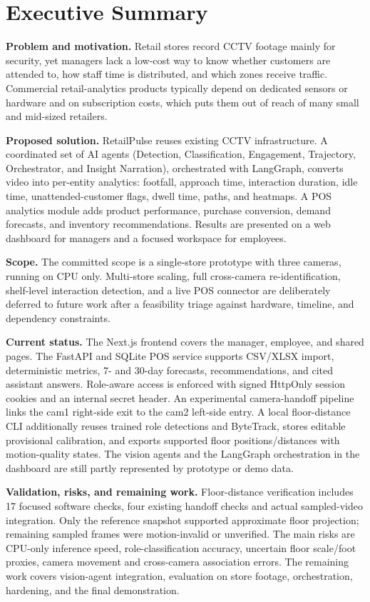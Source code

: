 \chapter*{Executive Summary}
\textbf{Problem and motivation.} Retail stores record CCTV footage mainly for security, yet managers lack a low-cost way to know whether customers are attended to, how staff time is distributed, and which zones receive traffic. Commercial retail-analytics products typically depend on dedicated sensors or hardware and on subscription costs, which puts them out of reach of many small and mid-sized retailers.

\textbf{Proposed solution.} RetailPulse reuses existing CCTV infrastructure. A coordinated set of AI agents (Detection, Classification, Engagement, Trajectory, Orchestrator, and Insight Narration), orchestrated with LangGraph, converts video into per-entity analytics: footfall, approach time, interaction duration, idle time, unattended-customer flags, dwell time, paths, and heatmaps. A POS analytics module adds product performance, purchase conversion, demand forecasts, and inventory recommendations. Results are presented on a web dashboard for managers and a focused workspace for employees.

\textbf{Scope.} The committed scope is a single-store prototype with three cameras, running on CPU only. Multi-store scaling, full cross-camera re-identification, shelf-level interaction detection, and a live POS connector are deliberately deferred to future work after a feasibility triage against hardware, timeline, and dependency constraints.

\textbf{Current status.} The Next.js frontend covers the manager, employee, and shared pages. The FastAPI and SQLite POS service supports CSV/XLSX import, deterministic metrics, 7- and 30-day forecasts, recommendations, and cited assistant answers. Role-aware access is enforced with signed HttpOnly session cookies and an internal secret header. An experimental camera-handoff pipeline links the cam1 right-side exit to the cam2 left-side entry. A local floor-distance CLI additionally reuses trained role detections and ByteTrack, stores editable provisional calibration, and exports supported floor positions/distances with motion-quality states. The vision agents and the LangGraph orchestration in the dashboard are still partly represented by prototype or demo data.

\textbf{Validation, risks, and remaining work.} Floor-distance verification includes 17 focused software checks, four existing handoff checks and actual sampled-video integration. Only the reference snapshot supported approximate floor projection; remaining sampled frames were motion-invalid or unverified. The main risks are CPU-only inference speed, role-classification accuracy, uncertain floor scale/foot proxies, camera movement and cross-camera association errors. The remaining work covers vision-agent integration, evaluation on store footage, orchestration, hardening, and the final demonstration.
